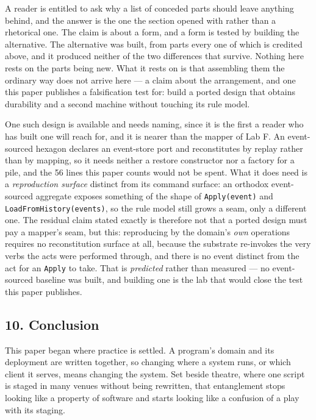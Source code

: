 \documentclass[
]{article}
\begin{document}
A reader is entitled to ask why a list of conceded parts should leave
anything behind, and the answer is the one the section opened with
rather than a rhetorical one. The claim is about a form, and a form is
tested by building the alternative. The alternative was built, from
parts every one of which is credited above, and it produced neither of
the two differences that survive. Nothing here rests on the parts being
new. What it rests on is that assembling them the ordinary way does not
arrive here --- a claim about the arrangement, and one this paper
publishes a falsification test for: build a ported design that obtains
durability and a second machine without touching its rule model.

One such design is available and needs naming, since it is the first a
reader who has built one will reach for, and it is nearer than the
mapper of Lab F. An event-sourced hexagon declares an event-store port
and reconstitutes by replay rather than by mapping, so it needs neither
a restore constructor nor a factory for a pile, and the 56 lines this
paper counts would not be spent. What it does need is a
\emph{reproduction surface} distinct from its command surface: an
orthodox event-sourced aggregate exposes something of the shape of
\texttt{Apply(event)} and \texttt{LoadFromHistory(events)}, so the rule
model still grows a seam, only a different one. The residual claim
stated exactly is therefore not that a ported design must pay a mapper's
seam, but this: reproducing by the domain's \emph{own} operations
requires no reconstitution surface at all, because the substrate
re-invokes the very verbs the acts were performed through, and there is
no event distinct from the act for an \texttt{Apply} to take. That is
\emph{predicted} rather than measured --- no event-sourced baseline was
built, and building one is the lab that would close the test this paper
publishes.

\subsection{10. Conclusion}\label{conclusion}

This paper began where practice is settled. A program's domain and its
deployment are written together, so changing where a system runs, or
which client it serves, means changing the system. Set beside theatre,
where one script is staged in many venues without being rewritten, that
entanglement stops looking like a property of software and starts
looking like a confusion of a play with its staging.
\end{document}
